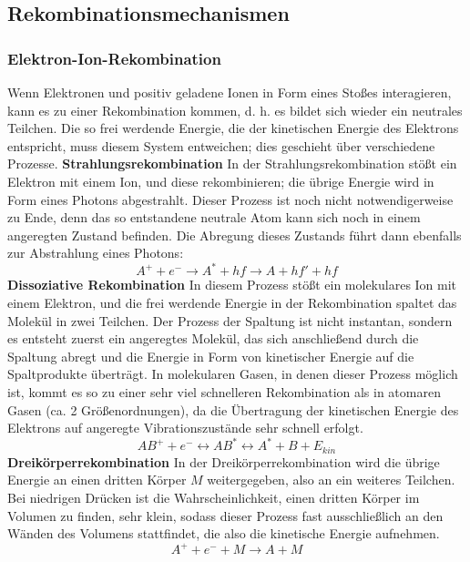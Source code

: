\subsection{Rekombinationsmechanismen}
\subsubsection{Elektron-Ion-Rekombination}
Wenn Elektronen und positiv geladene Ionen in Form eines Stoßes interagieren, kann es zu einer Rekombination kommen, d. h. es bildet sich wieder ein neutrales Teilchen. Die so frei werdende Energie, die der kinetischen Energie des Elektrons entspricht, muss diesem System entweichen; dies geschieht über verschiedene Prozesse.\newline\newline
\textbf{Strahlungsrekombination}
In der Strahlungsrekombination stößt ein Elektron mit einem Ion, und diese rekombinieren; die übrige Energie wird in Form eines Photons abgestrahlt. Dieser Prozess ist noch nicht notwendigerweise zu Ende, denn das so entstandene neutrale Atom kann sich noch in einem angeregten Zustand befinden. Die Abregung dieses Zustands führt dann ebenfalls zur Abstrahlung eines Photons:
\begin{equation}
    A^+ + e^- \rightarrow A^* + hf \rightarrow A + hf' + hf
    \label{eq:radiationrecombination}
\end{equation}\newline
\textbf{Dissoziative Rekombination}
In diesem Prozess stößt ein molekulares Ion mit einem Elektron, und die frei werdende Energie in der Rekombination spaltet das Molekül in zwei Teilchen. Der Prozess der Spaltung ist nicht instantan, sondern es entsteht zuerst ein angeregtes Molekül, das sich anschließend durch die Spaltung abregt und die Energie in Form von kinetischer Energie auf die Spaltprodukte überträgt. In molekularen Gasen, in denen dieser Prozess möglich ist, kommt es so zu einer sehr viel schnelleren Rekombination als in atomaren Gasen (ca. 2 Größenordnungen), da die Übertragung der kinetischen Energie des Elektrons auf angeregte Vibrationszustände sehr schnell erfolgt.
\begin{equation}
    AB^+ + e^- \leftrightarrow AB^* \leftrightarrow A^* + B + E_{kin}
\end{equation}\newline
\textbf{Dreikörperrekombination}
In der Dreikörperrekombination wird die übrige Energie an einen dritten Körper \(M\) weitergegeben, also an ein weiteres Teilchen. Bei niedrigen Drücken ist die Wahrscheinlichkeit, einen dritten Körper im Volumen zu finden, sehr klein, sodass dieser Prozess fast ausschließlich an den Wänden des Volumens stattfindet, die also die kinetische Energie aufnehmen.
\begin{equation}
    A^+ + e^- + M \rightarrow A + M
\end{equation}

